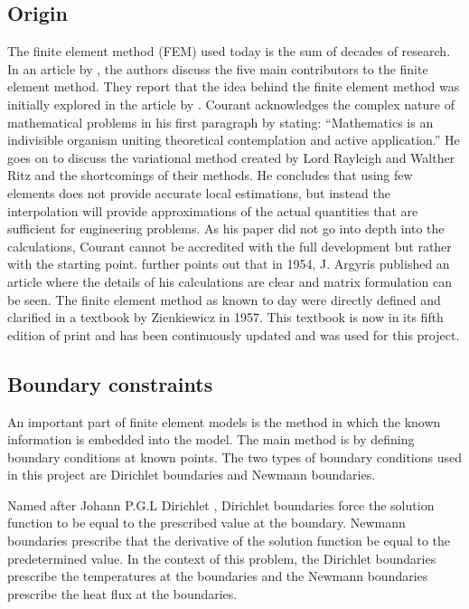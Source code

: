 	\subsection{Origin}
	The finite element method (FEM) used today is the sum of decades of research. 
	In an article by \citet{Gupta:1996}, the authors discuss the five main contributors to the finite element method. 
	They report that the idea behind the finite element method was initially explored in the \citeyear{Courant:1943} article by \citeauthor{Courant:1943}.
	Courant acknowledges the complex nature of mathematical problems in his first paragraph by stating: ``Mathematics is an indivisible organism uniting theoretical contemplation and active application.''
	He goes on to discuss the variational method created by Lord Rayleigh and Walther Ritz and the shortcomings of their methods.
	He concludes that using few elements does not provide accurate local estimations, but instead the interpolation will provide approximations of the actual quantities that are sufficient for engineering problems.
	As his paper did not go into depth into the calculations, Courant cannot be accredited with the full development but rather with the starting point.
	\citet{Gupta:1996} further points out that in 1954, J. Argyris published an article  where the details of his calculations are clear and matrix formulation can be seen.
	The finite element method as known to day were directly defined and clarified in a textbook by Zienkiewicz in 1957.
	This textbook is now in its fifth edition of print and has been continuously updated and was used for this project.
	
	\subsection{Boundary constraints}
	An important part of finite element models is the method in which the known information is embedded into the model.
	The main method is by defining boundary conditions at known points. The two types of boundary conditions used in this project are Dirichlet boundaries and Newmann boundaries.
	
	Named after Johann P.G.L Dirichlet \citep{Cheng:2005}, Dirichlet boundaries force the solution function to be equal to the prescribed value at the boundary. 
	Newmann boundaries prescribe that the derivative of the solution function be equal to the predetermined value. 
	In the context of this problem, the Dirichlet boundaries prescribe the temperatures at the boundaries and the Newmann boundaries prescribe the heat flux at the boundaries.
	

